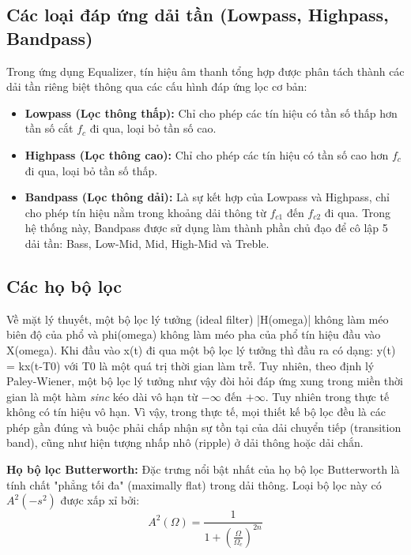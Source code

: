 \documentclass[12pt,a4paper]{article}
\begin{document}
\subsection{Các loại đáp ứng dải tần (Lowpass, Highpass, Bandpass)}
Trong ứng dụng Equalizer, tín hiệu âm thanh tổng hợp được phân tách thành các dải tần riêng biệt thông qua các cấu hình đáp ứng lọc cơ bản:
\begin{itemize}
    \item \textbf{Lowpass (Lọc thông thấp):} Chỉ cho phép các tín hiệu có tần số thấp hơn tần số cắt $f_c$ đi qua, loại bỏ tần số cao.
    \item \textbf{Highpass (Lọc thông cao):} Chỉ cho phép các tín hiệu có tần số cao hơn $f_c$ đi qua, loại bỏ tần số thấp.
    \item \textbf{Bandpass (Lọc thông dải):} Là sự kết hợp của Lowpass và Highpass, chỉ cho phép tín hiệu nằm trong khoảng dải thông từ $f_{c1}$ đến $f_{c2}$ đi qua. Trong hệ thống này, Bandpass được sử dụng làm thành phần chủ đạo để cô lập 5 dải tần: Bass, Low-Mid, Mid, High-Mid và Treble.
\end{itemize}

\subsection{Các họ bộ lọc}
Về mặt lý thuyết, một bộ lọc lý tưởng (ideal filter) |H(omega)| không làm méo biên độ của phổ và phi(omega) không làm méo pha của phổ tín hiệu đầu vào X(omega). Khi đầu vào x(t) đi qua một bộ lọc lý tưởng thì đầu ra có dạng: y(t) = kx(t-T0) với T0 là một quá trị thời gian làm trễ. Tuy nhiên, theo định lý Paley-Wiener, một bộ lọc lý tưởng như vậy đòi hỏi đáp ứng xung trong miền thời gian là một hàm \textit{sinc} kéo dài vô hạn từ $-\infty$ đến $+\infty$. Tuy nhiên trong thực tế không có tín hiệu vô hạn. 
Vì vậy, trong thực tế, mọi thiết kế bộ lọc đều là các phép gần đúng và buộc phải chấp nhận sự tồn tại của dải chuyển tiếp (transition band), cũng như hiện tượng nhấp nhô (ripple) ở dải thông hoặc dải chắn. 

\vspace{0.5cm} 
\noindent\textbf{Họ bộ lọc Butterworth:} Đặc trưng nổi bật nhất của họ bộ lọc Butterworth là tính chất "phẳng tối đa" (maximally flat) trong dải thông. Loại bộ lọc này có $A^2(-s^2)$ được xấp xỉ bởi:
\begin{equation} \label{eq:butterworth}
    A^2(\Omega) = \frac{1}{1 + \left(\frac{\Omega}{\Omega_c}\right)^{2n}}
\end{equation}
\end{document}
